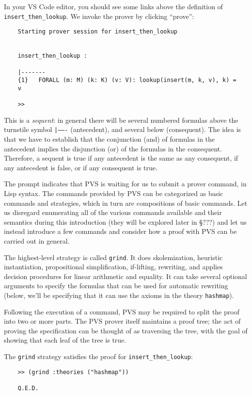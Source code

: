 In your VS Code editor, you should see some links above the definition of \texttt{insert\_then\_lookup}. We invoke the prover by clicking ``prove'':

\begin{verbatim}
	Starting prover session for insert_then_lookup
	
	
	insert_then_lookup :
	
	|-------
	{1}   FORALL (m: M) (k: K) (v: V): lookup(insert(m, k, v), k) =
	v
	
	>>  
\end{verbatim}

This is a \emph{sequent}: in general there will be several numbered formulas above the turnstile symbol \texttt{|-------} (antecedent), and several below (consequent).
The idea is that we have to establish that the conjunction (and) of formulas in the antecedent implies the disjunction (or) of the formulas in the consequent.
Therefore, a sequent is true if any antecedent is the same as any consequent, if any antecedent is false, or if any consequent is true.

The prompt indicates that PVS is waiting for us to submit a prover command, in Lisp syntax.
The commands provided by PVS can be categorized as basic commands and strategies, which in turn are compositions of basic commands.
Let us disregard enumerating all of the various commands available and their semantics during this introduction (they will be explored later in \S ???) and let us instead introduce a few commands and consider how a proof with PVS can be carried out in general.

The highest-level strategy is called \texttt{grind}. It does skolemization, heuristic instantiation, propositional simplification, if-lifting, rewriting, and applies decision procedures for linear arithmetic and equality.
It can take several optional arguments to specify the formulas that can be used for automatic rewriting (below, we'll be specifying that it can use the axioms in the theory \texttt{hashmap}).

Following the execution of a command, PVS may be required to split the proof into two or more parts.
The PVS prover itself maintains a proof tree; the act of proving the specification can be thought of as traversing the tree, with the goal of showing that each leaf of the tree is true.

The \texttt{grind} strategy satisfies the proof for \texttt{insert\_then\_lookup}:

\begin{verbatim}
	>> (grind :theories ("hashmap"))
	
	Q.E.D.
\end{verbatim}

